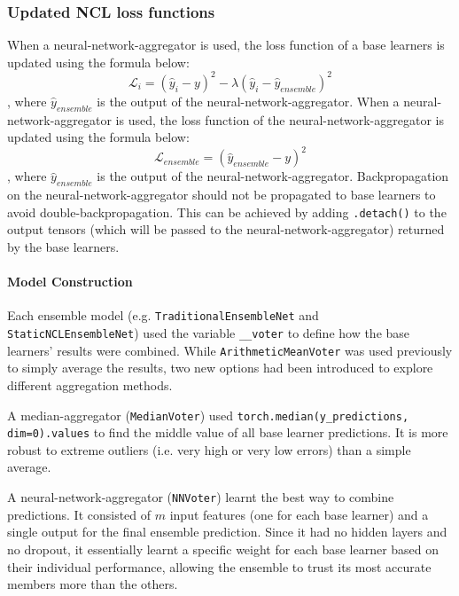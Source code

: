\subsubsection{Updated NCL loss functions}
When a neural-network-aggregator is used, the loss function of a base learners is updated using the formula below: 
\begin{equation}
    \label{equation:recursive_nn_loss_function_base_learner}
    \mathcal{L}_i = (\hat{y}_i - y)^2 - \lambda (\hat{y}_i - \hat{y}_{ensemble})^2
\end{equation}
, where $\hat{y}_{ensemble}$ is the output of the neural-network-aggregator. When a neural-network-aggregator is used, the loss function of the neural-network-aggregator is updated using the formula below: 
\begin{equation}
    \label{equation:recursive_nn_loss_function_aggregator}
    \mathcal{L}_{ensemble} = (\hat{y}_{ensemble} - y)^2
\end{equation}
, where $\hat{y}_{ensemble}$ is the output of the neural-network-aggregator. Backpropagation on the neural-network-aggregator should not be propagated to base learners to avoid double-backpropagation. This can be achieved by adding \texttt{.detach()} to the output tensors (which will be passed to the neural-network-aggregator) returned by the base learners. 


\paragraph{Model Construction}
Each ensemble model (e.g. \texttt{TraditionalEnsembleNet} and \texttt{StaticNCLEnsembleNet}) used the variable \texttt{\_\_voter} to define how the base learners' results were combined. While \texttt{ArithmeticMeanVoter} was used previously to simply average the results, two new options had been introduced to explore different aggregation methods. 

A median-aggregator (\texttt{MedianVoter}) used \texttt{torch.median(y\_predictions, dim=0).values} to find the middle value of all base learner predictions. It is more robust to extreme outliers (i.e. very high or very low errors) than a simple average. 

A neural-network-aggregator (\texttt{NNVoter}) learnt the best way to combine predictions. It consisted of $m$ input features (one for each base learner) and a single output for the final ensemble prediction. Since it had no hidden layers and no dropout, it essentially learnt a specific weight for each base learner based on their individual performance, allowing the ensemble to trust its most accurate members more than the others. 


